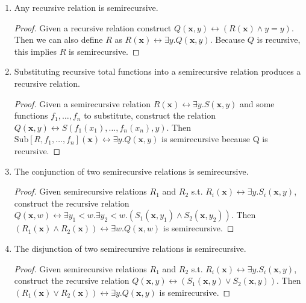 \begin{enumerate}
    \item Any recursive relation is semirecursive.
    
      \begin{proof}
        Given a recursive relation construct $Q(\mathbf{x}, y) \leftrightarrow
        (R(\mathbf{x}) \land y = y)$. Then we can also define $R$ as
        $R(\mathbf{x}) \leftrightarrow \exists y. Q(\mathbf{x}, y)$. Because $Q$
        is recursive, this implies $R$ is semirecursive.
      \end{proof}

    \item Substituting recursive total functions into a semirecursive relation
    produces a recursive relation.

      \begin{proof}
        Given a semirecursive relation $R(\mathbf{x}) \leftrightarrow \exists y.
        S(\mathbf{x}, y)$ and some functions $f_1, \ldots, f_n$ to substitute,
        construct the relation $Q(\mathbf{x}, y) \leftrightarrow S(f_1(x_1),
        \ldots, f_n(x_n), y)$.  Then $\mathrm{Sub}[R, f_1, \ldots,
        f_n](\mathbf{x}) \leftrightarrow \exists y. Q(\mathbf{x}, y)$ is
        semirecursive because Q is recursive.
      \end{proof}

    \item The conjunction of two semirecursive relations is semirecursive.

      \begin{proof}
        Given semirecursive relations $R_1$ and $R_2$ s.t. $R_i(\mathbf{x})
        \leftrightarrow \exists y.  S_i(\mathbf{x}, y)$, construct the recursive
        relation $Q(\mathbf{x}, w) \leftrightarrow \exists y_1 < w .\exists y_2
        < w.  (S_1(\mathbf{x}, y_1) \land S_2(\mathbf{x}, y_2))$. Then
        $(R_1(\mathbf{x}) \land R_2(\mathbf{x})) \leftrightarrow \exists w.
        Q(\mathbf{x}, w)$ is semirecursive.
      \end{proof}

    \item The disjunction of two semirecursive relations is semirecursive.

      \begin{proof}
        Given semirecursive relations $R_1$ and $R_2$ s.t. $R_i(\mathbf{x})
        \leftrightarrow \exists y.  S_i(\mathbf{x}, y)$, construct the recursive
        relation $Q(\mathbf{x}, y) \leftrightarrow (S_1(\mathbf{x}, y) \lor
        S_2(\mathbf{x}, y))$. Then $(R_1(\mathbf{x}) \lor R_2(\mathbf{x}))
        \leftrightarrow \exists y.  Q(\mathbf{x}, y)$ is semirecursive.
      \end{proof}
    

\end{enumerate}
